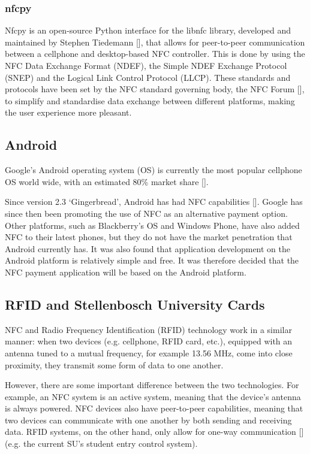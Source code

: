 \subsubsection{nfcpy}
\label{sec:nfcpy}

Nfcpy is an open-source Python interface for the libnfc library, developed and maintained
by Stephen Tiedemann [\cite{website:nfcpy}], that allows for peer-to-peer communication
between a cellphone and desktop-based NFC controller. This is done by using the NFC Data
Exchange Format (NDEF), the Simple NDEF Exchange Protocol (SNEP) and the Logical Link Control
Protocol (LLCP). These standards and protocols have been set by the NFC standard governing
body, the NFC Forum [\cite{website:nfc-forum}], to simplify and standardise data exchange
between different platforms, making the user experience more pleasant.

\subsection{Android}

Google's Android operating system (OS) is currently the most popular cellphone OS world
wide, with an estimated 80\% market share [\cite{article:android-marketshare}]. 

Since version 2.3 `Gingerbread', Android has had NFC capabilities
[\cite{website:android-gingerbread}]. Google has since then been promoting the use of NFC
as an alternative payment option. Other platforms, such as Blackberry's OS and Windows Phone, have also added NFC to their latest phones, but they do
not have the market penetration that Android currently has. It was also found that
application development on the Android platform is relatively simple and free. It was
therefore decided that the NFC payment application will be based on the Android platform.

\subsection{RFID and Stellenbosch University Cards}

NFC and Radio Frequency Identification (RFID) technology work in a similar manner: when
two devices  (e.g. cellphone, RFID card, etc.), equipped with an antenna
tuned to a mutual frequency, for example 13.56 MHz, come into close
proximity, they transmit some form of data to one another.

However, there are some important difference between the two technologies. For example, an
NFC system is  an active system, meaning that the device's antenna is always powered. NFC
devices also have peer-to-peer capabilities, meaning that two  devices can communicate
with one another by both sending and receiving data. RFID systems, on the other hand,
only allow for one-way communication [\cite{article:diff-nfc-rfid}] (e.g. the current SU's
student entry control system).

